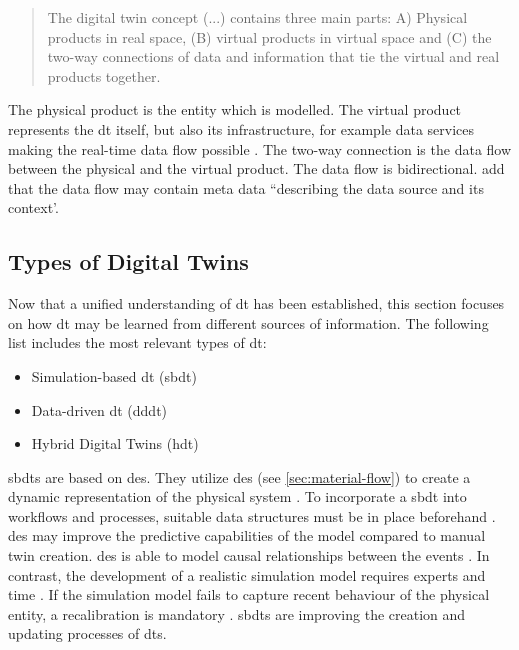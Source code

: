 \begin{quote}
  The digital twin concept (...) contains three main parts: A) Physical products in real space, (B) virtual products in virtual space and (C) the two-way connections of data and information that tie the virtual and real products together. \autocite{grieves2014digital}
\end{quote}

The physical product is the entity which is modelled. The virtual product represents the \gls{dt} itself, but also its infrastructure, for example data services making the real-time data flow possible \autocite{Tao2018ijamt}. The two-way connection is the data flow between the physical and the virtual product. The data flow is bidirectional. \textcite{zehnder2018representing} add that the data flow may contain meta data ``describing the data source and its context'.

\subsection*{Types of Digital Twins}
\label{sec:types-digital-twins}
Now that a unified understanding of \gls{dt} has been established, this section focuses on how \gls{dt} may be learned from different sources of information. The following list includes the most relevant types of \gls{dt}:

\begin{itemize}
  \item Simulation-based \gls{dt} (\gls{sbdt}) \autocite{Lugaresi2021aifac,martinez2018automatic}
  \item Data-driven \gls{dt} (\gls{dddt}) \autocite{he2019data,Friederich2022}
  \item Hybrid Digital Twins (\gls{hdt}) \autocite{luo2020hybrid,huang2023hybrid}
\end{itemize}


\gls{sbdt}s \autocite{Lugaresi2021aifac,martinez2018automatic,boschert2016digital} are based on \gls{des}. They utilize \gls{des} (see \autoref{sec:material-flow}) to create a dynamic representation of the physical system \autocite{schluse2016simulation,pantelides2013online}. To incorporate a \gls{sbdt} into workflows and processes, suitable data structures must be in place beforehand \autocite{boschert2016digital}. \gls{des} may improve the predictive capabilities of the model compared to manual twin creation. \gls{des} is able to model causal relationships between the events \autocite{francis2021towards}. In contrast, the development of a realistic simulation model requires experts and time \autocite{Charpentier2014}. If the simulation model fails to capture recent behaviour of the physical entity, a recalibration is mandatory \autocite{Friederich2022}. \gls{sbdt}s are improving the creation and updating processes of \gls{dt}s.

